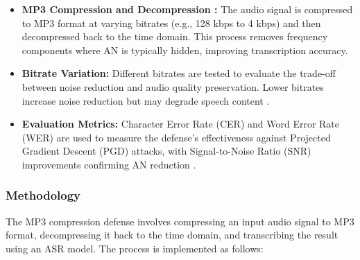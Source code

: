 \documentclass[a4paper,12pt]{article}
\begin{document}
\begin{itemize}
    \item \textbf{MP3 Compression and Decompression \cite{andronic2020mp3}:} The audio signal is compressed to MP3 format at varying bitrates (e.g., 128 kbps to 4 kbps) and then decompressed back to the time domain. This process removes frequency components where AN is typically hidden, improving transcription accuracy.
    \item \textbf{Bitrate Variation:} Different bitrates are tested to evaluate the trade-off between noise reduction and audio quality preservation. Lower bitrates increase noise reduction but may degrade speech content \cite{andronic2020mp3}.
    \item \textbf{Evaluation Metrics:} Character Error Rate (CER) and Word Error Rate (WER) are used to measure the defense's effectiveness against Projected Gradient Descent (PGD) attacks, with Signal-to-Noise Ratio (SNR) improvements confirming AN reduction \cite{andronic2020mp3}.
\end{itemize}

\newpage
\subsubsection{Methodology}
The MP3 compression defense involves compressing an input audio signal to MP3 format, decompressing it back to the time domain, and transcribing the result using an ASR model. The process is implemented as follows:
\end{document}
